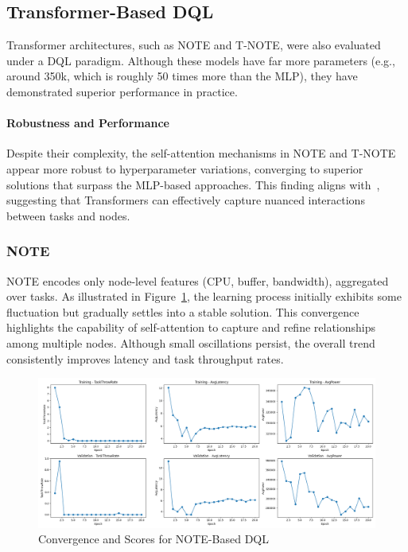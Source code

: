 \documentclass[preprint,3p,authoryear]{elsarticle}
\begin{document}
\subsection{Transformer-Based DQL}\label{subsec:transformer_perf}

Transformer architectures, such as NOTE and T-NOTE, were also evaluated under a DQL paradigm. Although these models have far more parameters (e.g., around 350k, which is roughly 50 times more than the MLP), they have demonstrated superior performance in practice. 

\paragraph{Robustness and Performance}
Despite their complexity, the self-attention mechanisms in NOTE and T-NOTE appear more robust to hyperparameter variations, converging to superior solutions that surpass the MLP-based approaches. This finding aligns with~\cite{gholipour_tpto_2023}, suggesting that Transformers can effectively capture nuanced interactions between tasks and nodes. 



\subsubsection{NOTE}
NOTE encodes only node-level features (CPU, buffer, bandwidth), aggregated over tasks. As illustrated in Figure~\ref{fig:NOTE-score-plot}, the learning process initially exhibits some fluctuation but gradually settles into a stable solution. This convergence highlights the capability of self-attention to capture and refine relationships among multiple nodes. Although small oscillations persist, the overall trend consistently improves latency and task throughput rates.

\begin{figure}[H]
    \centering
    \includegraphics[width=1\linewidth]{figs/NOTE/score_plot.png}
    \caption{Convergence and Scores for NOTE-Based DQL}
    \label{fig:NOTE-score-plot}
\end{figure}
\end{document}
